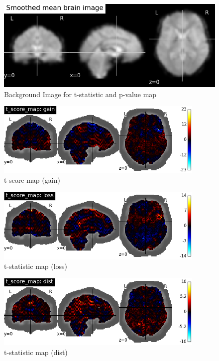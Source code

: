 \begin{figure}[h!]
\centering
\includegraphics[width=120mm]{images/brain_template.png}               
\caption{Background Image for t-statistic and p-value map}
\label{fig:brain_temp}
\end{figure}

\begin{figure}[h!]
\centering
\includegraphics[width=100mm]{images/t_scores_gain.png}               
\caption{t-score map (gain)}
\label{fig:t_gain}
\end{figure}

\begin{figure}[h!]
\centering
\includegraphics[width=100mm]{images/t_scores_loss.png}               
\caption{t-statistic map (loss)}
\label{fig:t_loss}
\end{figure}

\begin{figure}[h!]
\centering
\includegraphics[width=100mm]{images/t_scores_dist.png}               
\caption{t-statistic map (dist)}
\label{fig:t_dist}
\end{figure}


